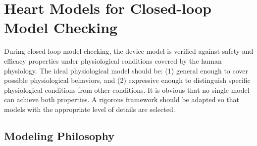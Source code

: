 \section{Heart Models for Closed-loop Model Checking}
During closed-loop model checking, the device model is verified against safety and efficacy properties under physiological conditions covered by the human physiology. 
The ideal physiological model should be: (1) general enough to cover possible physiological behaviors, and (2) expressive enough to distinguish specific physiological conditions from other conditions. 
It is obvious that no single model can achieve both properties.
 A rigorous framework should be adapted so that models with the appropriate level of details are selected.

\subsection{Modeling Philosophy}

